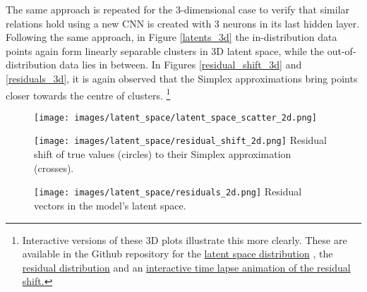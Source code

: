 \documentclass{article}
\begin{document}
The same approach is repeated for the 3-dimensional case to verify that similar relations hold using a new CNN is created with 3 neurons in its last hidden layer. Following the same approach, in Figure \ref{latents_3d} the in-distribution data points again form linearly separable clusters in 3D latent space, while the out-of-distribution data lies in between. In Figures \ref{residual_shift_3d} and \ref{residuals_3d}, it is again observed that the Simplex approximations bring points closer towards the centre of clusters.
\footnote{Interactive versions of these 3D plots illustrate this more clearly. These are available in the Github repository for the
\href{https://htmlpreview.github.io/?https://github.com/gjohl/xai/blob/master/xai/experiments/report_figures/latent_space/interactive_latent_space_scatter_3d.html}{latent space distribution}
, the
\href{https://htmlpreview.github.io/?https://github.com/gjohl/xai/blob/master/xai/experiments/report_figures/latent_space/interactive_residuals_3d.html}{residual distribution}
and an
\href{https://htmlpreview.github.io/?https://github.com/gjohl/xai/blob/master/xai/experiments/report_figures/latent_space/interactive_residual_shift_3d.html}{interactive time lapse animation of the residual shift.}
}


\begin{figure}[h]
\centering
\begin{minipage}{.25\textwidth}
  \centering
  \texttt{[image: images/latent\_space/latent\_space\_scatter\_2d.png]}
  \label{latents_2d}
\end{minipage}%
\hspace{.05\textwidth}
\begin{minipage}{.25\textwidth}
  \centering
  \texttt{[image: images/latent\_space/residual\_shift\_2d.png]}
  {Residual shift of true values (circles) to their Simplex approximation (crosses).}
  \label{residual_shift_2d}
\end{minipage}
\begin{minipage}{.25\textwidth}
  \centering
  \texttt{[image: images/latent\_space/residuals\_2d.png]}
  {Residual vectors in the model's latent space.}
  \label{residuals_2d}
\end{minipage}
\end{figure}
\end{document}
